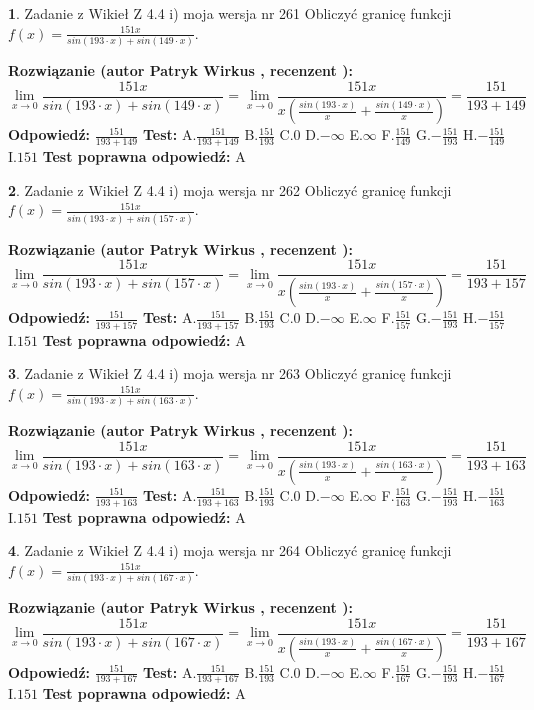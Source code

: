 \documentclass[12pt, a4paper]{article}
\theoremstyle{definition} %
\newtheorem{zad}{}
\newcommand{\zadStart}[1]{\begin{zad}#1\newline}
\newcommand{\zadStop}{\end{zad}}
\newcommand{\rozwStart}[2]{\noindent \textbf{Rozwiązanie (autor #1 , recenzent #2): }\newline}
\newcommand{\rozwStop}{\newline}
\newcommand{\odpStart}{\noindent \textbf{Odpowiedź:}\newline}
\newcommand{\odpStop}{\newline}
\newcommand{\testStart}{\noindent \textbf{Test:}\newline}
\newcommand{\testStop}{\newline}
\newcommand{\kluczStart}{\noindent \textbf{Test poprawna odpowiedź:}\newline}
\newcommand{\kluczStop}{\newline}
\begin{document}
\zadStart{Zadanie z Wikieł Z 4.4 i) moja wersja nr 261}
Obliczyć granicę funkcji $f(x)=\frac{151x}{sin(193\cdot x) +sin(149\cdot x)}$.
\zadStop
\rozwStart{Patryk Wirkus}{}
$$\lim\limits_{x\to 0}\frac{151x}{sin(193\cdot x) +sin(149\cdot x)}=\lim\limits_{x\to 0}\frac{151x}{x(\frac{sin(193\cdot x)}{x}+\frac{sin(149\cdot x)}{x})}=\frac{151}{193+149}$$
\rozwStop
\odpStart
$\frac{151}{193+149}$
\odpStop
\testStart
A.$\frac{151}{193+149}$
B.$\frac{151}{193}$
C.$0$
D.$-\infty$
E.$\infty$
F.$\frac{151}{149}$
G.$-\frac{151}{193}$
H.$-\frac{151}{149}$
I.$151$
\testStop
\kluczStart
A
\kluczStop



\zadStart{Zadanie z Wikieł Z 4.4 i) moja wersja nr 262}
Obliczyć granicę funkcji $f(x)=\frac{151x}{sin(193\cdot x) +sin(157\cdot x)}$.
\zadStop
\rozwStart{Patryk Wirkus}{}
$$\lim\limits_{x\to 0}\frac{151x}{sin(193\cdot x) +sin(157\cdot x)}=\lim\limits_{x\to 0}\frac{151x}{x(\frac{sin(193\cdot x)}{x}+\frac{sin(157\cdot x)}{x})}=\frac{151}{193+157}$$
\rozwStop
\odpStart
$\frac{151}{193+157}$
\odpStop
\testStart
A.$\frac{151}{193+157}$
B.$\frac{151}{193}$
C.$0$
D.$-\infty$
E.$\infty$
F.$\frac{151}{157}$
G.$-\frac{151}{193}$
H.$-\frac{151}{157}$
I.$151$
\testStop
\kluczStart
A
\kluczStop



\zadStart{Zadanie z Wikieł Z 4.4 i) moja wersja nr 263}
Obliczyć granicę funkcji $f(x)=\frac{151x}{sin(193\cdot x) +sin(163\cdot x)}$.
\zadStop
\rozwStart{Patryk Wirkus}{}
$$\lim\limits_{x\to 0}\frac{151x}{sin(193\cdot x) +sin(163\cdot x)}=\lim\limits_{x\to 0}\frac{151x}{x(\frac{sin(193\cdot x)}{x}+\frac{sin(163\cdot x)}{x})}=\frac{151}{193+163}$$
\rozwStop
\odpStart
$\frac{151}{193+163}$
\odpStop
\testStart
A.$\frac{151}{193+163}$
B.$\frac{151}{193}$
C.$0$
D.$-\infty$
E.$\infty$
F.$\frac{151}{163}$
G.$-\frac{151}{193}$
H.$-\frac{151}{163}$
I.$151$
\testStop
\kluczStart
A
\kluczStop



\zadStart{Zadanie z Wikieł Z 4.4 i) moja wersja nr 264}
Obliczyć granicę funkcji $f(x)=\frac{151x}{sin(193\cdot x) +sin(167\cdot x)}$.
\zadStop
\rozwStart{Patryk Wirkus}{}
$$\lim\limits_{x\to 0}\frac{151x}{sin(193\cdot x) +sin(167\cdot x)}=\lim\limits_{x\to 0}\frac{151x}{x(\frac{sin(193\cdot x)}{x}+\frac{sin(167\cdot x)}{x})}=\frac{151}{193+167}$$
\rozwStop
\odpStart
$\frac{151}{193+167}$
\odpStop
\testStart
A.$\frac{151}{193+167}$
B.$\frac{151}{193}$
C.$0$
D.$-\infty$
E.$\infty$
F.$\frac{151}{167}$
G.$-\frac{151}{193}$
H.$-\frac{151}{167}$
I.$151$
\testStop
\kluczStart
A
\kluczStop
\end{document}

